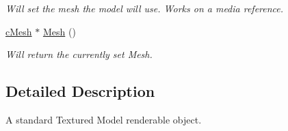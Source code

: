 \begin{DoxyCompactItemize}
\begin{DoxyCompactList}\small\item\em Will set the mesh the model will use. Works on a media reference. \end{DoxyCompactList}\item 
\hypertarget{classc_model_ac742f3b754cb8a5634e104529c5e5c55}{
\hyperlink{classc_mesh}{cMesh} $\ast$ \hyperlink{classc_model_ac742f3b754cb8a5634e104529c5e5c55}{Mesh} ()}
\label{classc_model_ac742f3b754cb8a5634e104529c5e5c55}

\begin{DoxyCompactList}\small\item\em Will return the currently set Mesh. \end{DoxyCompactList}\end{DoxyCompactItemize}


\subsection{Detailed Description}
A standard Textured Model renderable object. 
